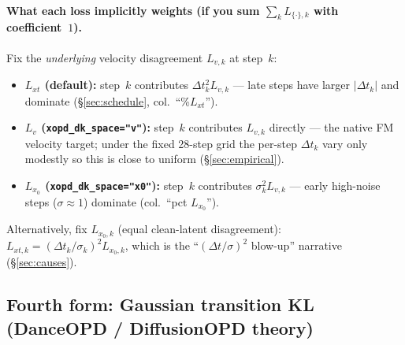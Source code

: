 \documentclass[11pt,a4paper]{article}
\newcommand{\dt}{\Delta t}
\begin{document}
\paragraph{What each loss implicitly weights (if you sum $\sum_k L_{\{\cdot\},k}$ with coefficient~$1$).}
Fix the \emph{underlying} velocity disagreement $L_{v,k}$ at step~$k$:
\begin{itemize}[leftmargin=1.5em]
\item \textbf{$L_{xt}$ (default):} step~$k$ contributes $\dt_k^2 L_{v,k}$ --- late steps have larger
$\lvert\dt_k\rvert$ and dominate (\S\ref{sec:schedule}, col.~``\%$L_{xt}$'').
\item \textbf{$L_v$ (\texttt{xopd\_dk\_space="v"}):} step~$k$ contributes $L_{v,k}$ directly --- the
native FM velocity target; under the fixed 28-step grid the per-step $\dt_k$ vary only modestly so
this is close to uniform (\S\ref{sec:empirical}).
\item \textbf{$L_{x_0}$ (\texttt{xopd\_dk\_space="x0"}):} step~$k$ contributes $\sigma_k^2 L_{v,k}$ ---
early high-noise steps ($\sigma\approx1$) dominate (col.~``pct $L_{x_0}$'').
\end{itemize}
Alternatively, fix $L_{x_0,k}$ (equal clean-latent disagreement): $L_{xt,k}=(\dt_k/\sigma_k)^2
L_{x_0,k}$, which is the ``$(\dt/\sigma)^2$ blow-up'' narrative (\S\ref{sec:causes}).

\subsection{Fourth form: Gaussian transition KL (DanceOPD / DiffusionOPD theory)}
\label{ssec:danceopd-kl}
\end{document}
